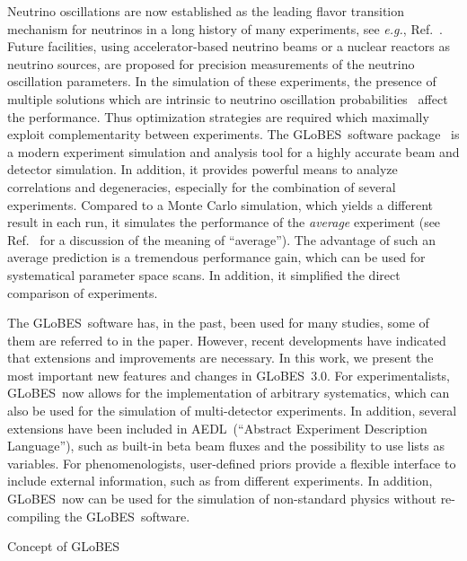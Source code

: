 \documentclass[12pt,a4paper]{article}
\makeatletter
\renewcommand{\section}{\@startsection{section}{1}{0em}{-\baselineskip}%
{\baselineskip}{\normalfont\large\bfseries}}
\newcommand{\eg}{{\it e.g.}}
\newcommand{\Ref}{Ref.}
\newcommand{\GLOBES}{{\sf GLoBES}}
\newcommand{\GLOBESN}{{\sf GLoBES~3.0}}
\newcommand{\AEDL}{{\sf AEDL}}
\makeatother
\begin{document}
Neutrino oscillations are now established as the leading flavor
transition mechanism for neutrinos in a long history of many experiments, see
\eg , \Ref~\cite{Barger:2003qi}. Future facilities, using accelerator-based
 neutrino beams or a nuclear reactors as neutrino sources, are proposed
for precision measurements of the neutrino oscillation parameters. In the
simulation of these experiments, 
the presence of multiple solutions which are intrinsic to
 neutrino oscillation probabilities~\cite{Fogli:1996pv,Burguet-Castell:2001ez,Minakata:2001qm,Barger:2001yr} 
affect the performance.
Thus optimization strategies are required which maximally exploit 
complementarity between experiments. The \GLOBES\ software package~\cite{Huber:2004ka}
is a  modern experiment  simulation  and analysis tool for
a highly accurate beam and detector simulation. In addition, it provides powerful 
means to analyze correlations and degeneracies, especially for the combination
of several experiments. Compared to a Monte Carlo simulation, which yields a different
result in each run, it simulates the performance of the {\em average} experiment
(see \Ref~\cite{Schwetz:2006md} for a discussion of the meaning of ``average'').
The advantage of such an average prediction is a tremendous performance gain,
which can be used for systematical parameter space scans. In addition, it 
simplified the direct comparison of experiments.

The \GLOBES\ software has, in the past, been used for many studies, some of them
are referred to in the paper. However, recent developments have indicated that extensions
and improvements are necessary. In this work, we present the most important new
features and changes in \GLOBESN . For experimentalists, \GLOBES\ now allows
for the implementation of arbitrary systematics, which can also be used for
the simulation of multi-detector experiments. In addition, several extensions
have been included in \AEDL\ (``Abstract Experiment Description Language''), such as
built-in beta beam fluxes and the possibility to use lists as variables.
For phenomenologists, user-defined
priors provide a flexible interface to include external information, such as from
different experiments. In addition, \GLOBES\ now can be used for the simulation
of non-standard physics without re-compiling the \GLOBES\ software.

\section{Concept of \GLOBES }
\end{document}
